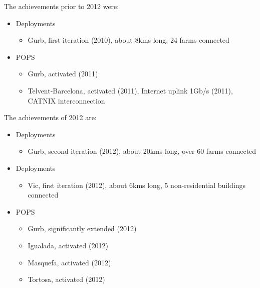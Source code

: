 The achievements prior to 2012 were:

\begin{itemize}
  \item Deployments
    \begin{itemize}
      \item Gurb, first iteration (2010), about 8kms long, 24 farms connected
    \end{itemize}
  \item POPS
    \begin{itemize}
      \item Gurb, activated (2011)
      \item Telvent-Barcelona, activated (2011), Internet uplink 1Gb/s (2011), CATNIX interconnection
    \end{itemize}
\end{itemize}

The achievements of 2012 are:

\begin{itemize}
  \item Deployments
    \begin{itemize}
      \item Gurb, second iteration (2012), about 20kms long, over 60 farms connected
    \end{itemize}
  \item Deployments
    \begin{itemize}
      \item Vic, first iteration (2012), about 6kms long, 5 non-residential buildings connected
    \end{itemize}
  \item POPS
    \begin{itemize}
      \item Gurb, significantly extended (2012)
    \end{itemize}
    \begin{itemize}
      \item Igualada, activated (2012)
    \end{itemize}    
    \begin{itemize}
      \item Masquefa, activated (2012)
    \end{itemize}
    \begin{itemize}
      \item Tortosa, activated (2012)
    \end{itemize}
\end{itemize}

